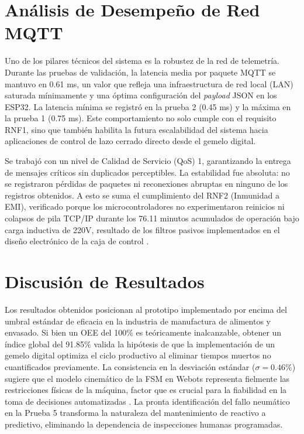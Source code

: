 \section{Análisis de Desempeño de Red MQTT}

Uno de los pilares técnicos del sistema es la robustez de la red de telemetría. Durante las pruebas de validación, la latencia media por paquete MQTT se mantuvo en 0.61 ms, un valor que refleja una infraestructura de red local (LAN) saturada mínimamente y una óptima configuración del \textit{payload} JSON en los ESP32. La latencia mínima se registró en la prueba 2 (0.45 ms) y la máxima en la prueba 1 (0.75 ms). Este comportamiento no solo cumple con el requisito RNF1, sino que también habilita la futura escalabilidad del sistema hacia aplicaciones de control de lazo cerrado directo desde el gemelo digital.

Se trabajó con un nivel de Calidad de Servicio (QoS) 1, garantizando la entrega de mensajes críticos sin duplicados perceptibles. La estabilidad fue absoluta: no se registraron pérdidas de paquetes ni reconexiones abruptas en ninguno de los registros obtenidos. A esto se suma el cumplimiento del RNF2 (Inmunidad a EMI), verificado porque los microcontroladores no experimentaron reinicios ni colapsos de pila TCP/IP durante los 76.11 minutos acumulados de operación bajo carga inductiva de 220V, resultado de los filtros pasivos implementados en el diseño electrónico de la caja de control \cite{Caiza2020DigitalTwin}.

\section{Discusión de Resultados}

Los resultados obtenidos posicionan al prototipo implementado por encima del umbral estándar de eficacia en la industria de manufactura de alimentos y envasado. Si bien un OEE del 100\% es teóricamente inalcanzable, obtener un índice global del 91.85\% valida la hipótesis de que la implementación de un gemelo digital optimiza el ciclo productivo al eliminar tiempos muertos no cuantificados previamente. La consistencia en la desviación estándar ($\sigma = 0.46\%$) sugiere que el modelo cinemático de la FSM en Webots representa fielmente las restricciones físicas de la máquina, factor que es crucial para la fiabilidad en la toma de decisiones automatizadas \cite{Qi2018DigitalTwin}. La pronta identificación del fallo neumático en la Prueba 5 transforma la naturaleza del mantenimiento de reactivo a predictivo, eliminando la dependencia de inspecciones humanas programadas.

